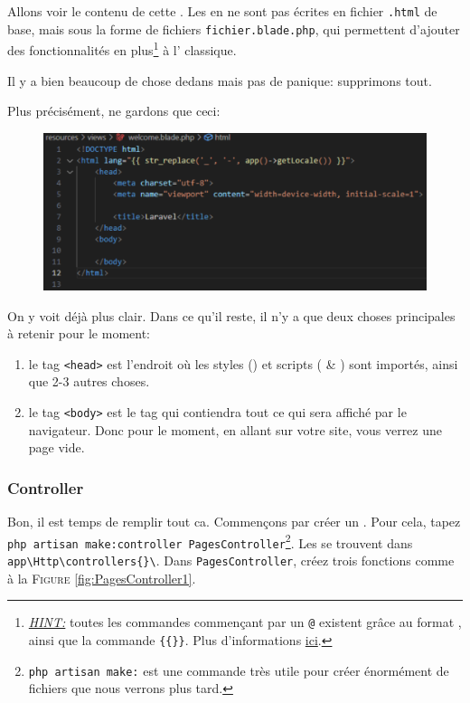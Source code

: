 \documentclass[internal]{nhitec_design}
\begin{document}
Allons voir le contenu de cette \view{}. Les \views{} en \laravel{} ne sont pas écrites en fichier \verb|.html| de base, mais sous la forme de fichiers \verb|fichier.blade.php|, qui permettent d'ajouter des fonctionnalités en plus\footnote{\textit{\underline{HINT:}} toutes les commandes commençant par un \verb|@| existent grâce au format \blade{}, ainsi que la commande \verb|{{}}|. Plus d'informations \href{https://laravel.com/docs/10.x/blade#blade-directives}{ici}.} à l'\html{} classique. 

Il y a bien beaucoup de chose dedans mais pas de panique: supprimons tout.

Plus précisément, ne gardons que ceci:

\begin{figure}[!h]
    \centering
    \includegraphics[width=\textwidth]{figures-C1/welcome_blade_empty.pdf}
\end{figure}

On y voit déjà plus clair. Dans ce qu'il reste, il n'y a que deux choses principales à retenir pour le moment: 
\begin{enumerate}
    \item le tag \verb|<head>| est l'endroit où les styles (\css{}) et scripts (\jquery{}  \& \js{}) sont importés, ainsi que 2-{}3 autres choses.
    \item le tag \verb|<body>| est le tag qui contiendra tout ce qui sera affiché par le navigateur. Donc pour le moment, en allant sur votre site, vous verrez une page vide.
\end{enumerate}

\subsubsection[Controller][laravel.com/docs/10.x/controllers\#introduction]{Controller}
Bon, il est temps de remplir tout ca. Commençons par créer un \controller{}. Pour cela, tapez
\verb|php artisan make:controller PagesController|\footnote{\verb|php artisan make:| est une commande très utile pour créer énormément de fichiers que nous verrons plus tard.}. Les \controllers{} se trouvent dans \verb|app\Http\controllers{}\|. Dans \verb|PagesController|, créez trois fonctions comme à la \textsc{Figure }\ref{fig:PagesController1}.
\end{document}
